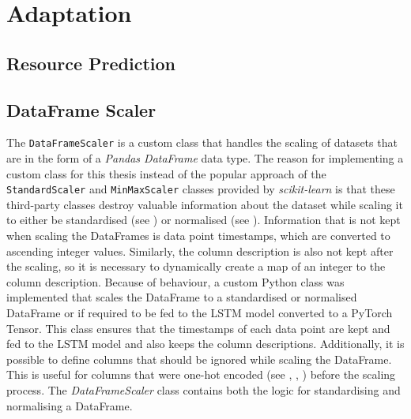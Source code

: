   



  

  



  

\section{Adaptation}
  \subsection{Resource Prediction}
  \subsection{DataFrame Scaler}
  \label{sec:dataframe-scaler-architecture-and-implementation}

    The \texttt{DataFrameScaler} is a custom class that handles the scaling of datasets that are in the form of a \emph{Pandas DataFrame} data type. 
    The reason for implementing a custom class for this thesis instead of the popular approach of the \texttt{StandardScaler} and \texttt{MinMaxScaler} classes provided by \emph{scikit-learn} is that these third-party classes destroy valuable information about the dataset while scaling it to either be standardised (see ) or normalised (see ). 
    Information that is not kept when scaling the DataFrames is data point timestamps, which are converted to ascending integer values. Similarly, the column description is also not kept after the scaling, so it is necessary to dynamically create a map of an integer to the column description.
    Because of behaviour, a custom Python class was implemented that scales the DataFrame to a standardised or normalised DataFrame or if required to be fed to the LSTM model converted to a PyTorch Tensor.
    This class ensures that the timestamps of each data point are kept and fed to the LSTM model and also keeps the column descriptions. Additionally, it is possible to define columns that should be ignored while scaling the DataFrame. This is useful for columns that were one-hot encoded (see , , ) before the scaling process.
    The \emph{DataFrameScaler} class contains both the logic for standardising and normalising a DataFrame.

